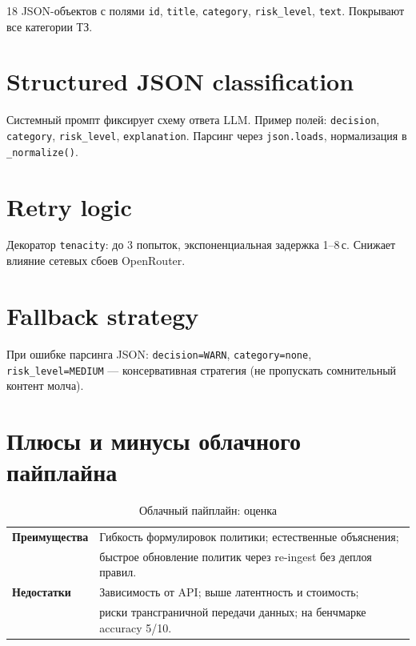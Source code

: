 \documentclass[12pt,a4paper]{report}
\begin{document}
18 JSON-объектов с полями \texttt{id}, \texttt{title}, \texttt{category},
\texttt{risk\_level}, \texttt{text}. Покрывают все категории ТЗ.

\section{Structured JSON classification}

Системный промпт фиксирует схему ответа LLM. Пример полей:
\texttt{decision}, \texttt{category}, \texttt{risk\_level}, \texttt{explanation}.
Парсинг через \texttt{json.loads}, нормализация в \texttt{\_normalize()}.

\section{Retry logic}

Декоратор \texttt{tenacity}: до 3 попыток, экспоненциальная задержка 1--8\,с.
Снижает влияние сетевых сбоев OpenRouter.

\section{Fallback strategy}

При ошибке парсинга JSON: \texttt{decision=WARN}, \texttt{category=none},
\texttt{risk\_level=MEDIUM} --- консервативная стратегия (не пропускать сомнительный контент молча).

\section{Плюсы и минусы облачного пайплайна}

\begin{table}[H]
\centering
\caption{Облачный пайплайн: оценка}
\begin{tabularx}{\textwidth}{@{}lX@{}}
\toprule
\textbf{Преимущества} & Гибкость формулировок политики; естественные объяснения; \\
& быстрое обновление политик через re-ingest без деплоя правил. \\
\midrule
\textbf{Недостатки} & Зависимость от API; выше латентность и стоимость; \\
& риски трансграничной передачи данных; на бенчмарке accuracy 5/10. \\
\bottomrule
\end{tabularx}
\end{table}

\end{document}
